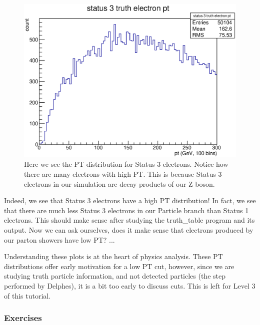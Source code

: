 \documentclass{article}
\begin{document}
\begin{figure}[h]
	\centering
	\includegraphics[width = \linewidth]{truth_electron_3_pt.eps}
	\caption{Here we see the PT distribution for Status 3 electrons. Notice how there are many electrons with high PT. This is because Status 3 electrons in our simulation are decay products of our Z boson.}
	\label{fig:truthElectron3PT}
\end{figure}

\bigskip

Indeed, we see that Status 3 electrons have a high PT distribution! In fact, we see that there are much less Status 3 electrons in our Particle branch than Status 1 electrons. This should make sense after studying the truth\_table program and its output. Now we can ask ourselves, does it make sense that electrons produced by our parton showers have low PT? ...

\bigskip

Understanding these plots is at the heart of physics analysis. These PT distributions offer early motivation for a low PT cut, however, since we are studying truth particle information, and not detected particles (the step performed by Delphes), it is a bit too early to discuss cuts. This is left for Level 3 of this tutorial.

\subsubsection*{Exercises}
\end{document}
